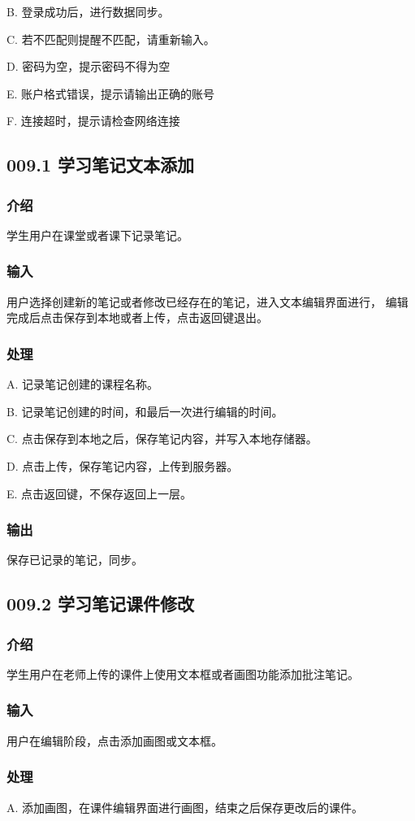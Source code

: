     B. 登录成功后，进行数据同步。

    C. 若不匹配则提醒不匹配，请重新输入。

    D. 密码为空，提示密码不得为空

    E. 账户格式错误，提示请输出正确的账号

    F. 连接超时，提示请检查网络连接
 \subsection{009.1 学习笔记文本添加}
    \subsubsection{介绍}
	学生用户在课堂或者课下记录笔记。
    \subsubsection{输入}
	用户选择创建新的笔记或者修改已经存在的笔记，进入文本编辑界面进行，
编辑完成后点击保存到本地或者上传，点击返回键退出。
    \subsubsection{处理}
	A. 记录笔记创建的课程名称。

	B. 记录笔记创建的时间，和最后一次进行编辑的时间。

	C. 点击保存到本地之后，保存笔记内容，并写入本地存储器。

	D. 点击上传，保存笔记内容，上传到服务器。
	
	E. 点击返回键，不保存返回上一层。
    \subsubsection{输出}
	保存已记录的笔记，同步。
 \subsection{009.2 学习笔记课件修改}
    \subsubsection{介绍}
	学生用户在老师上传的课件上使用文本框或者画图功能添加批注笔记。
    \subsubsection{输入}
	用户在编辑阶段，点击添加画图或文本框。
    \subsubsection{处理}
	A. 添加画图，在课件编辑界面进行画图，结束之后保存更改后的课件。
	
